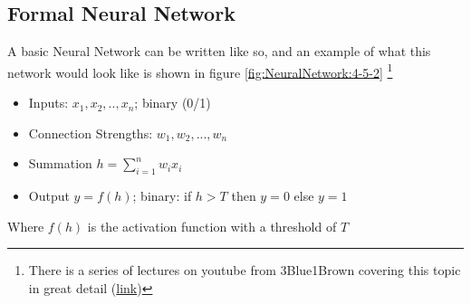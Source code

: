 \subsection{Formal Neural Network}
A basic Neural Network can be written like so, and an example of what this network would look like is shown in figure \ref{fig:NeuralNetwork:4-5-2} \footnote{There is a series of lectures on youtube from 3Blue1Brown covering this topic in great detail (\href{https://www.youtube.com/watch?v=aircAruvnKk&list=PLZHQObOWTQDNU6R1_67000Dx_ZCJB-3pi}{link})}
\begin{itemize}
    \item Inputs: $x_1, x_2,..,x_n$; binary (0/1)
    \item Connection Strengths: $w_1,w_2,...,w_n$ 
    \item Summation $ h = \sum_{i=1}^{n} w_i x_i$
    \item Output $y = f(h)$; binary: if $h > T$ then $y = 0$ else $y =1$
\end{itemize}
Where $f(h)$ is the activation function with a threshold of $T$
